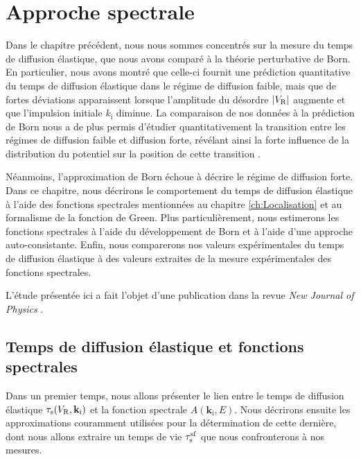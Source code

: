 

\chapter{Approche spectrale}
\label{ch:TauS_NJP}

Dans le chapitre précédent, nous nous sommes concentrés sur la mesure du temps de diffusion élastique, que nous avons comparé à la théorie perturbative de Born. En particulier, nous avons montré que celle-ci fournit une prédiction quantitative du temps de diffusion élastique dans le régime de diffusion faible, mais que de fortes déviations apparaissent lorsque l'amplitude du désordre $|V_{\mathrm{R}}|$ augmente et que l'impulsion initiale $k_{\mathrm{i}}$ diminue. La comparaison de nos données à la prédiction de Born nous a de plus permis d'étudier quantitativement la transition entre les régimes de diffusion faible et diffusion forte, révélant ainsi la forte influence de la distribution du potentiel sur la position de cette transition \citep{richard2019elastic}. 

Néanmoins, l'approximation de Born échoue à décrire le régime de diffusion forte. Dans ce chapitre, nous décrirons le comportement du temps de diffusion élastique à l'aide des fonctions spectrales mentionnées au chapitre \ref{ch:Localisation} et au formalisme de la fonction de Green. Plus particulièrement, nous estimerons les fonctions spectrales à l'aide du développement de Born et à l'aide d'une approche auto-consistante. Enfin, nous comparerons nos valeurs expérimentales du temps de diffusion élastique à des valeurs extraites de la mesure expérimentales des fonctions spectrales.

L'étude présentée ici a fait l'objet d'une publication dans la revue \emph{New Journal of Physics} \citep{signoles2019ultracold}.

\section{Temps de diffusion élastique et fonctions spectrales}

Dans un premier temps, nous allons présenter le lien entre le temps de diffusion élastique $\tau_{\mathrm{s}}(V_{\mathrm{R}},\mathbf{k}_{\mathrm{i}})$ et la fonction spectrale $A(\mathbf{k}_{\mathrm{i}},E)$. Nous décrirons ensuite les approximations couramment utilisées pour la détermination de cette dernière, dont nous allons extraire un temps de vie $\tau_{\mathrm{s}}^{\mathrm{sf}}$ que nous confronterons à nos mesures. 


